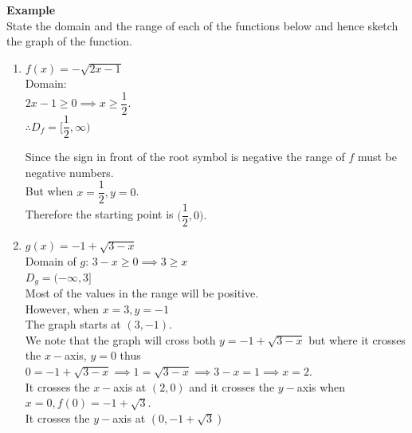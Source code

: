 \documentclass[11pt,a4paper]{article}
\begin{document}
\textbf{Example}\\
State the domain and the range of each of the functions below and hence sketch the graph of the function.

\begin{enumerate}
\item $f(x)=-\sqrt{2x-1}$\\

Domain:\\
$2x-1\geq 0\implies x\geq \dfrac{1}{2}$.\\

$\therefore D_f=\bigg[\dfrac{1}{2},\infty\bigg)$

Since the sign in front of the root symbol is negative the range of $f$ must be negative numbers.\\
But when $x=\dfrac{1}{2}, y=0$.\\
Therefore the starting point is $\bigg(\dfrac{1}{2},0\bigg).$




\begin{figure}[H]
\centering
{}
\end{figure}


\item $g(x)=-1+\sqrt{3-x}$\\

Domain of $g$: $3-x\geq 0\implies 3\geq x$\\

$D_g=(-\infty,3]$\\

Most of the values in the range will be positive.\\
However, when $x=3, y=-1$\\
The graph starts at $(3,-1)$.\\
We note that the graph will cross both $y=-1+\sqrt{3-x}$ but where it crosses the $x-$axis, $y=0$ thus $0=-1+\sqrt{3-x}\implies 1=\sqrt{3-x}\implies 3-x=1\implies x=2$.\\

It crosses the $x-$axis at $(2,0)$ and it crosses the $y-$axis when $x=0, f(0)=-1+\sqrt{3}$.\\
It crosses the $y-$axis at $(0,-1+\sqrt{3})$



\end{enumerate}
\end{document}
